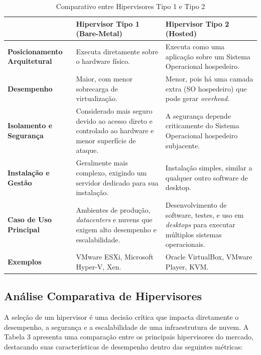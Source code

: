 \begin{table}[H]
    \centering
    \caption{Comparativo entre Hipervisores Tipo 1 e Tipo 2}
    \label{tab:comparativo_hipervisores}
    \begin{tabularx}{\textwidth}{ >{\bfseries}l >{\raggedright\arraybackslash}X >{\raggedright\arraybackslash}X }
        \toprule
        & \textbf{Hipervisor Tipo 1 (Bare-Metal)} & \textbf{Hipervisor Tipo 2 (Hosted)} \\
        \midrule
        Posicionamento Arquitetural & Executa diretamente sobre o hardware físico. & Executa como uma aplicação sobre um Sistema Operacional hospedeiro. \\
        \addlinespace
        Desempenho & Maior, com menor sobrecarga de virtualização. & Menor, pois há uma camada extra (SO hospedeiro) que pode gerar \textit{overhead}. \\
        \addlinespace
        Isolamento e Segurança & Considerado mais seguro devido ao acesso direto e controlado ao hardware e menor superfície de ataque. & A segurança depende criticamente do Sistema Operacional hospedeiro subjacente. \\
        \addlinespace
        Instalação e Gestão & Geralmente mais complexo, exigindo um servidor dedicado para sua instalação. & Instalação simples, similar a qualquer outro software de desktop. \\
        \addlinespace
        Caso de Uso Principal & Ambientes de produção, \textit{datacenters} e nuvens que exigem alto desempenho e escalabilidade. & Desenvolvimento de software, testes, e uso em \textit{desktops} para executar múltiplos sistemas operacionais. \\
        \addlinespace
        Exemplos & VMware ESXi, Microsoft Hyper-V, Xen. & Oracle VirtualBox, VMware Player, KVM. \\
        \bottomrule
    \end{tabularx}
\end{table}


\subsection{Análise Comparativa de Hipervisores}
A seleção de um hipervisor é uma decisão crítica que impacta diretamente o desempenho, a segurança e a escalabilidade de uma infraestrutura de nuvem. A Tabela 3 apresenta uma comparação entre os principais hipervisores do mercado, destacando suas características de desempenho dentro das seguintes métricas:

